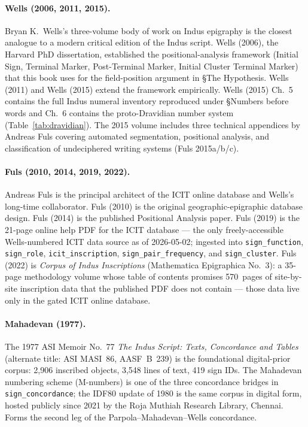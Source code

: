 \paragraph{Wells (2006, 2011, 2015).}\smartcite{Wells2015}
Bryan K.~Wells's three-volume body of work on Indus epigraphy is
the closest analogue to a modern critical edition of the Indus
script. Wells (2006), the Harvard PhD dissertation, established
the positional-analysis framework (Initial Sign, Terminal Marker,
Post-Terminal Marker, Initial Cluster Terminal Marker) that this
book uses for the field-position argument in §The Hypothesis.
Wells (2011) and Wells (2015) extend the framework empirically.
Wells (2015) Ch.~5 contains the full Indus numeral inventory
reproduced under §Numbers before words and Ch.~6 contains the
proto-Dravidian number system (Table~\ref{tab:dravidian}).
The 2015 volume includes three technical appendices by Andreas
Fuls covering automated segmentation, positional analysis, and
classification of undeciphered writing systems (Fuls 2015a/b/c).

\paragraph{Fuls (2010, 2014, 2019, 2022).}
Andreas Fuls is the principal architect of the ICIT online database
and Wells's long-time collaborator. Fuls (2010)\smartcite{Fuls2010}
is the original geographic-epigraphic database design. Fuls (2014)
is the published Positional Analysis paper. Fuls (2019) is the
21-page online help PDF for the ICIT database --- the only
freely-accessible Wells-numbered ICIT data source as of
2026-05-02; ingested into \texttt{sign\_function},
\texttt{sign\_role}, \texttt{icit\_inscription},
\texttt{sign\_pair\_frequency}, and \texttt{sign\_cluster}.
Fuls (2022)\smartcite{Fuls2022} is \textit{Corpus of Indus
Inscriptions} (Mathematica Epigraphica No.~3): a 35-page methodology
volume whose table of contents promises 570~pages of site-by-site
inscription data that the published PDF does not contain --- those
data live only in the gated ICIT online database.

\paragraph{Mahadevan (1977).}\smartcite{Mahadevan1977}
The 1977 ASI Memoir No.~77 \textit{The Indus Script: Texts,
Concordance and Tables} (alternate title: ASI MASI~86, AASF~B~239)
is the foundational digital-prior corpus: 2{,}906 inscribed objects,
3{,}548 lines of text, 419 sign IDs. The Mahadevan numbering scheme
(M-numbers) is one of the three concordance bridges in
\texttt{sign\_concordance}; the IDF80 update of 1980 is the same
corpus in digital form, hosted publicly since 2021 by the Roja
Muthiah Research Library, Chennai. Forms the second leg of the
Parpola--Mahadevan--Wells concordance.

